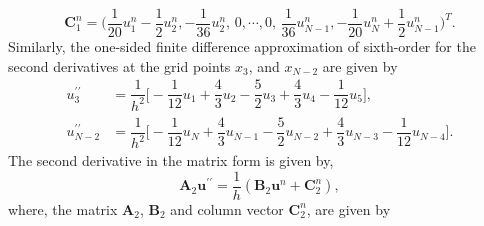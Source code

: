 \documentclass[11pt,a4paper]{amsart}
\theoremstyle{plain}
\theoremstyle{definition}
\theoremstyle{remark}
\numberwithin{equation}{section}
\begin{document}
\begin{equation} 
\mathbf{C}_1^n = \Biggl( \dfrac{1}{20}u_1^n-\dfrac{1}{2}u_2^n, -\dfrac{1}{36}u_2^n,\, 0, \cdots, 0,\, \dfrac{1}{36}u_{N-1}^n, -\dfrac{1}{20}u_{N}^n +\dfrac{1}{2}u_{N-1}^n \Biggr)^T.
\end{equation}
Similarly, the one-sided finite difference approximation of sixth-order for the second derivatives at the grid points $x_3$, and $x_{N-2}$ are given by
\begin{equation}
\begin{split} 
u^{\prime\prime}_{3} &= \dfrac{1}{h^2} \biggl[ -\dfrac{1}{12}u_{1} +\dfrac{4}{3}u_{2}-\dfrac{5}{2}u_{3}+\dfrac{4}{3}u_{4}-\dfrac{1}{12}u_{5} \biggr],\\
u^{\prime\prime}_{N-2} &= \dfrac{1}{h^2} \biggl[ -\dfrac{1}{12}u_{N} +\dfrac{4}{3}u_{N-1}-\dfrac{5}{2}u_{N-2} +\dfrac{4}{3}u_{N-3} -\dfrac{1}{12}u_{N-4} \biggr].
\end{split}
\end{equation}
The second derivative in the matrix form is given by,
\begin{equation}
    \mathbf{A}_2 \mathbf{u^{\prime\prime}} = \dfrac{1}{h} (\mathbf{B}_2 \mathbf{u}^n +\mathbf{C}_2^{n}),   
\end{equation}
where, the matrix $\mathbf{A}_2$, $\mathbf{B}_2$ and column vector $\mathbf{C}_2^{n}$, are given by
\end{document}
